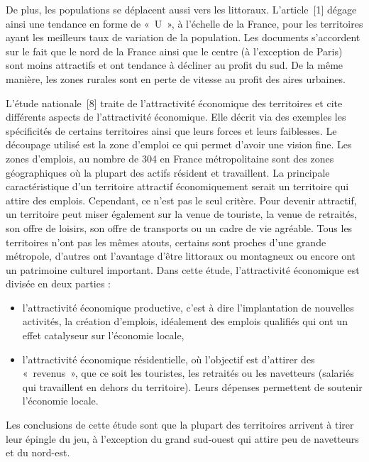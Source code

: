 \documentclass{article}
\begin{document}
\bigbreak

De plus, les populations se déplacent aussi vers les littoraux. L'article~[1] dégage ainsi une tendance en forme de «~U~», à l'échelle de la France, pour les territoires ayant les meilleurs taux de variation de la population. Les documents s'accordent sur le fait que le nord de la France ainsi que le centre (à l'exception de Paris) sont moins attractifs et ont tendance à décliner au profit du sud. De la même manière, les zones rurales sont en perte de vitesse au profit des aires urbaines. 

\bigbreak

L'étude nationale~[8] traite de l'attractivité économique des territoires et cite différents aspects de l'attractivité économique. Elle décrit via des exemples les spécificités de certains territoires ainsi que leurs forces et leurs faiblesses. Le découpage utilisé est la zone d'emploi ce qui permet d'avoir une vision fine. Les zones d'emplois, au nombre de 304 en France métropolitaine sont des zones géographiques où la plupart des actifs résident et travaillent. La principale caractéristique d'un territoire attractif économiquement serait un territoire qui attire des emplois. Cependant, ce n'est pas le seul critère. Pour devenir attractif, un territoire peut miser également sur la venue de touriste, la venue de retraités, son offre de loisirs, son offre de transports ou un cadre de vie agréable. Tous les territoires n'ont pas les mêmes atouts, certains sont proches d'une grande métropole, d'autres ont l'avantage d'être littoraux ou montagneux ou encore ont un patrimoine culturel important. Dans cette étude, l'attractivité économique est divisée en deux parties :

\begin{itemize}[label=\textbullet]
    \item l'attractivité économique productive, c'est à dire l'implantation de nouvelles activités, la création d'emplois, idéalement des emplois qualifiés qui ont un effet catalyseur sur l'économie locale, 
    \item l'attractivité économique résidentielle, où l'objectif est d'attirer des «~revenus~», que ce soit les touristes, les retraités ou les navetteurs (salariés qui travaillent en dehors du territoire). Leurs dépenses permettent de soutenir l'économie locale.
\end{itemize}

\noindent Les conclusions de cette étude sont que la plupart des territoires arrivent à tirer leur épingle du jeu, à l'exception du grand sud-ouest qui attire peu de navetteurs et du nord-est. 
\end{document}
